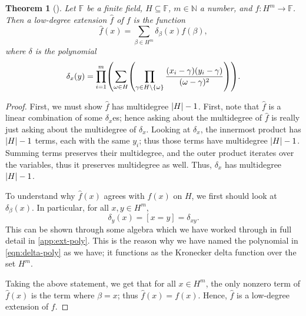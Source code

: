 \documentclass[english]{reedthesis}
\theoremstyle{plain}
\newtheorem{thm}{Theorem}[section]
\theoremstyle{definition}
\theoremstyle{remark}
\DeclarePairedDelimiter{\abs}{\lvert}{\rvert}
\begin{document}
\begin{thm}[{\cite[]{CFGS22}}]\label{thm:low-deg-ext-exists}
  Let $\mathbb{F}$ be a finite field, $H \subseteq \mathbb{F}$, $m \in \mathbb{N}$ a number, and
  $f: H^{m} \rightarrow \mathbb{F}$. Then a low-degree extension $\hat{f}$ of $f$ is the
  function
  \begin{equation}
    \hat{f}(x) = \sum_{\beta \in H^{m}}\delta_{\beta}(x)f(\beta),
  \end{equation}
  where $\delta$ is the polynomial
  \begin{equation}\label{eqn:delta-poly}
    \delta_{x}(y) = \prod_{i = 1}^{m}\mleft(\sum_{\omega \in H}\mleft(
        \prod_{\gamma \in H \setminus \{\omega\}}\frac{(x_{i} - \gamma)(y_{i} - \gamma)}{(\omega - \gamma)^{2}}
      \mright)\mright).
  \end{equation}
\end{thm}

\begin{proof}
  First, we must show $\hat{f}$ has multidegree $\abs{H} - 1$. First, note that
  $\hat{f}$ is a linear combination of some $\delta_{x}$es; hence asking about the
  multidegree of $\hat{f}$ is really just asking about the multidegree of
  $\delta_{x}$. Looking at $\delta_{x}$, the innermost product has $\abs{H} - 1$ terms,
  each with the same $y_{i}$; thus those terms have multidegree $\abs{H} - 1$.
  Summing terms preserves their multidegree, and the outer product iterates over
  the variables, thus it preserves multidegree as well. Thus, $\delta_{x}$ has
  multidegree $\abs{H} - 1$.

  To understand why $\hat{f}(x)$ agrees with $f(x)$ on $H$, we first should look
  at $\delta_{\beta}(x)$. In particular, for all $x, y \in H^{m}$,
  \begin{equation}\label{eqn:delta-is-delta}
    \delta_{y}(x) = [x = y] = \delta_{xy}.
  \end{equation}
  This can be shown through some algebra which we have worked through in full
  detail in \cref{app:ext-poly}. This is the reason why we have named the
  polynomial in \cref{eqn:delta-poly} as we have; it functions as the Kronecker
  delta function over the set $H^{m}$.

  Taking the above statement, we get that for all $x \in H^{m}$, the only nonzero
  term of $\hat{f}(x)$ is the term where $\beta = x$; thus $\hat{f}(x) = f(x)$.
  Hence, $\hat{f}$ is a low-degree extension of $f$.
\end{proof}
\end{document}
